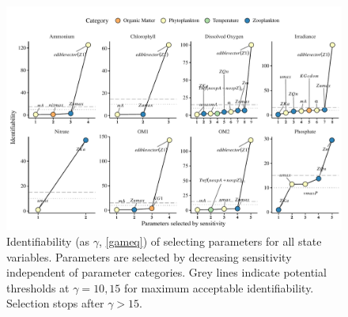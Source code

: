 \documentclass[letterpaper,12pt,oneside]{article}\usepackage[]{graphicx}\usepackage[]{color}
\begin{document}
\begin{figure}[!ht]

{\centering \includegraphics[width=\textwidth]{figs/heurist_stts-1} 

}

\caption[Identifiability (as ]{Identifiability (as $\gamma$, \cref{gameq}) of selecting parameters for all state variables. Parameters are selected by decreasing sensitivity independent of parameter categories. Grey lines indicate potential thresholds at $\gamma = 10, 15$ for maximum acceptable identifiability. Selection stops after $\gamma > 15$.}\label{fig:heurist_stts}
\end{figure}
\end{document}

